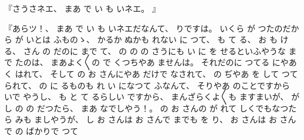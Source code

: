 %
『さうさネエ、
%
まあ
で%
い
も
いネエ。
』

%
『あらツ！、
%
まあ
で%
い
も
いネエだなんて、
%
りですは。
%
いくら
が
つたのだから
が
いとは
ふものゝ、
%
かるか
ぬかも
れない
に
つて、
%
も
て
る、
%
お
も
ける、
%
さん
の
だのに
まで
て、
%
の
の
の
さうにも
い
に%
を
せるといふやうな
まで
たのは、
%
まあよく〳〵の
で
くつちやあ
ませんは。
%
それだのに
つてる
にやあ
く
はれて、
%
そして
の
お
さんにやあ
だけで
なされて、
%
の
ぢやあ
を
して
つて
られて、
%
の
に
るものも
れ
い
になつて
ふなんて、
%
そりやあ
のことですから
いで
やうし、
%
も
と
て
るらしい
ですから、
%
まんざらくよ〳〵も
ますまいが、
%
が
し
の
の
だつたら、
%
まあ
なでしやう！。
%
の
お
さんの
が
れて
しくでもなつたら
みも
ましやうが、
%
し
お
さんは
お
さんで
までも
を
り、
%
お
さんは
お
さんで
の
ばかりで
つて
